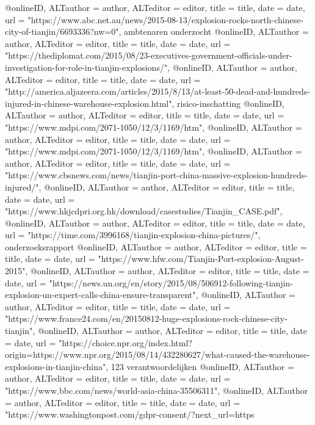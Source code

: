 {{{{{{{{{{{{@online{ID,	ALTauthor = {author},	ALTeditor = {editor},	title = {title},	date = {date},	url = {"https://www.abc.net.au/news/2015-08-13/explosion-rocks-north-chinese-city-of-tianjin/6693336?nw=0"},}
ambtenaren onderzocht
@online{ID,	ALTauthor = {author},	ALTeditor = {editor},	title = {title},	date = {date},	url = {"https://thediplomat.com/2015/08/23-executives-government-officials-under-investigation-for-role-in-tianjin-explosions/"},}
@online{ID,	ALTauthor = {author},	ALTeditor = {editor},	title = {title},	date = {date},	url = {"http://america.aljazeera.com/articles/2015/8/13/at-least-50-dead-and-hundreds-injured-in-chinese-warehouse-explosion.html"},}
risico-inschatting
@online{ID,	ALTauthor = {author},	ALTeditor = {editor},	title = {title},	date = {date},	url = {"https://www.mdpi.com/2071-1050/12/3/1169/htm"},}
@online{ID,	ALTauthor = {author},	ALTeditor = {editor},	title = {title},	date = {date},	url = {"https://www.mdpi.com/2071-1050/12/3/1169/htm"},}
@online{ID,	ALTauthor = {author},	ALTeditor = {editor},	title = {title},	date = {date},	url = {"https://www.cbsnews.com/news/tianjin-port-china-massive-explosion-hundreds-injured/"},}
@online{ID,	ALTauthor = {author},	ALTeditor = {editor},	title = {title},	date = {date},	url = {"https://www.hkjcdpri.org.hk/download/casestudies/Tianjin_CASE.pdf"},}
@online{ID,	ALTauthor = {author},	ALTeditor = {editor},	title = {title},	date = {date},	url = {"https://time.com/3996168/tianjin-explosion-china-pictures/"},}
onderzoeksrapport
@online{ID,	ALTauthor = {author},	ALTeditor = {editor},	title = {title},	date = {date},	url = {"https://www.hfw.com/Tianjin-Port-explosion-August-2015"},}
@online{ID,	ALTauthor = {author},	ALTeditor = {editor},	title = {title},	date = {date},	url = {"https://news.un.org/en/story/2015/08/506912-following-tianjin-explosion-un-expert-calls-china-ensure-transparent"},}
@online{ID,	ALTauthor = {author},	ALTeditor = {editor},	title = {title},	date = {date},	url = {"https://www.france24.com/en/20150812-huge-explosions-rock-chinese-city-tianjin"},}
@online{ID,	ALTauthor = {author},	ALTeditor = {editor},	title = {title},	date = {date},	url = {"https://choice.npr.org/index.html?origin=https://www.npr.org/2015/08/14/432280627/what-caused-the-warehouse-explosions-in-tianjin-china"},}
123 verantwoordelijken
@online{ID,	ALTauthor = {author},	ALTeditor = {editor},	title = {title},	date = {date},	url = {"https://www.bbc.com/news/world-asia-china-35506311"},}
@online{ID,	ALTauthor = {author},	ALTeditor = {editor},	title = {title},	date = {date},	url = {"https://www.washingtonpost.com/gdpr-consent/?next_url=https%
}}}}}}}}}}}}}}
